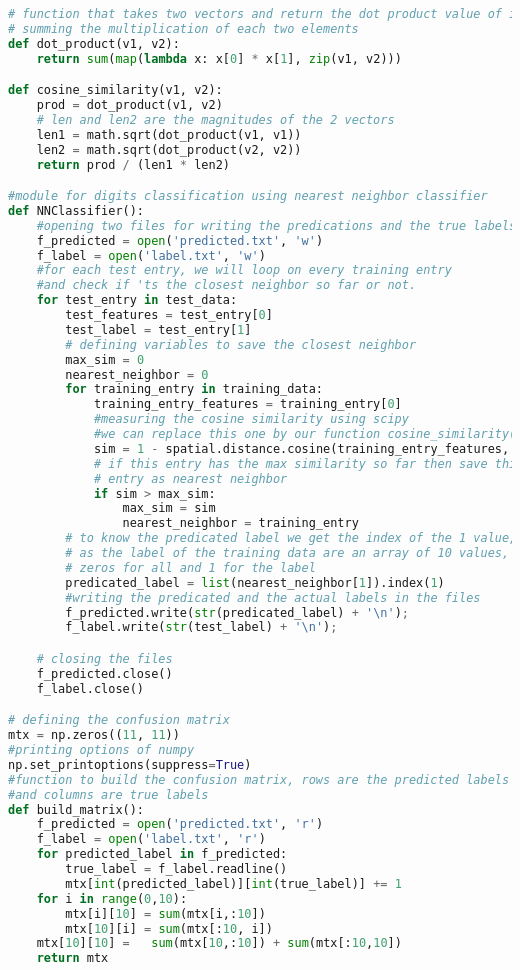 \begin{lstlisting}[language=Python]
# function that takes two vectors and return the dot product value of it by 
# summing the multiplication of each two elements 
def dot_product(v1, v2):
    return sum(map(lambda x: x[0] * x[1], zip(v1, v2)))

def cosine_similarity(v1, v2):
    prod = dot_product(v1, v2)
    # len and len2 are the magnitudes of the 2 vectors
    len1 = math.sqrt(dot_product(v1, v1))
    len2 = math.sqrt(dot_product(v2, v2))
    return prod / (len1 * len2)

#module for digits classification using nearest neighbor classifier
def NNClassifier():
    #opening two files for writing the predications and the true labels.
    f_predicted = open('predicted.txt', 'w')
    f_label = open('label.txt', 'w')
    #for each test entry, we will loop on every training entry 
	#and check if 'ts the closest neighbor so far or not.
    for test_entry in test_data:
        test_features = test_entry[0]    
        test_label = test_entry[1]
        # defining variables to save the closest neighbor
        max_sim = 0 
		nearest_neighbor = 0 
		for training_entry in training_data: 
			training_entry_features = training_entry[0] 
			#measuring the cosine similarity using scipy 
			#we can replace this one by our function cosine_similarity(v1,v2) 
			sim = 1 - spatial.distance.cosine(training_entry_features, test_features) 
			# if this entry has the max similarity so far then save this 
			# entry as nearest neighbor 
			if sim > max_sim: 
				max_sim = sim 
				nearest_neighbor = training_entry
        # to know the predicated label we get the index of the 1 value, 
		# as the label of the training data are an array of 10 values, 
		# zeros for all and 1 for the label      
        predicated_label = list(nearest_neighbor[1]).index(1)
        #writing the predicated and the actual labels in the files
        f_predicted.write(str(predicated_label) + '\n');
        f_label.write(str(test_label) + '\n');

    # closing the files
    f_predicted.close()
    f_label.close()

# defining the confusion matrix
mtx = np.zeros((11, 11))
#printing options of numpy
np.set_printoptions(suppress=True) 
#function to build the confusion matrix, rows are the predicted labels 
#and columns are true labels
def build_matrix():
    f_predicted = open('predicted.txt', 'r')
    f_label = open('label.txt', 'r')
    for predicted_label in f_predicted:
        true_label = f_label.readline()
        mtx[int(predicted_label)][int(true_label)] += 1
    for i in range(0,10):
        mtx[i][10] = sum(mtx[i,:10])
        mtx[10][i] = sum(mtx[:10, i])  
    mtx[10][10] =   sum(mtx[10,:10]) + sum(mtx[:10,10])
    return mtx    


\end{lstlisting}
